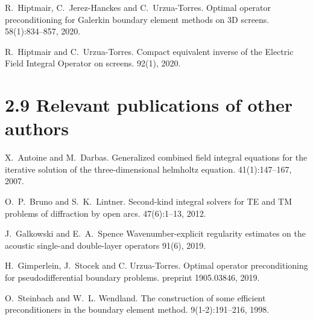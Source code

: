 \documentclass[]{report}
\begin{document}
\begin{thebibliography}{0}
	R.~Hiptmair, C.~Jerez-Hanckes and C.~Urzua-Torres.
	\newblock Optimal operator preconditioning for Galerkin boundary element methods on 3D screens. 
	 58(1):834--857, 2020.
	
	R.~Hiptmair and C.~Urzua-Torres.
	\newblock Compact equivalent inverse of the {E}lectric {F}ield
	{I}ntegral {O}perator on screens.
	 92(1), 2020.
	
\end{thebibliography}


\section*{2.9 Relevant publications of other authors}


\begin{thebibliography}{0}
	X.~Antoine and M.~Darbas.
	\newblock Generalized combined field integral equations for the iterative
	solution of the three-dimensional helmholtz equation.
	41(1):147--167, 2007.
	
	O.~P.~Bruno and S.~K.~Lintner.
	\newblock Second-kind integral solvers for TE and TM problems of diffraction by open arcs.
	 47(6):1--13, 2012.
	
	J.~Galkowski and E.~A.~Spence
	\newblock Wavenumber-explicit regularity estimates on the acoustic single-and double-layer operators
	91(6), 2019.
	
	H.~Gimperlein, J.~Stocek and C. Urzua-Torres.
	\newblock Optimal operator preconditioning for pseudodifferential boundary problems.
	 preprint 1905.03846, 2019.
	
	O.~Steinbach and W.~L. Wendland.
	\newblock The construction of some efficient preconditioners in the boundary
	element method.
	 9(1-2):191--216, 1998.	
\end{thebibliography}
\end{document}
